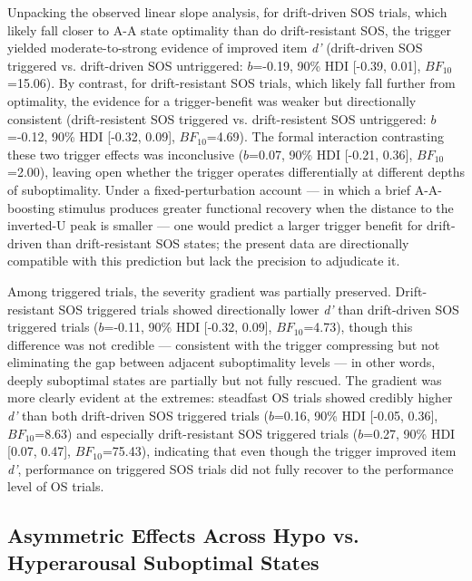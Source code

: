 Unpacking the observed linear slope analysis, for drift-driven SOS trials, which likely fall closer to A-A state optimality than do drift-resistant SOS, the trigger yielded moderate-to-strong evidence of improved item \textit{d'} (drift-driven SOS triggered vs. drift-driven SOS untriggered: $b$=-0.19, 90\% HDI [-0.39, 0.01], $BF_{10}$=15.06). By contrast, for drift-resistant SOS trials, which likely fall further from optimality, the evidence for a trigger-benefit was weaker but directionally consistent (drift-resistent SOS triggered vs. drift-resistent SOS untriggered: $b$=-0.12, 90\% HDI [-0.32, 0.09], $BF_{10}$=4.69). The formal interaction contrasting these two trigger effects was inconclusive ($b$=0.07, 90\% HDI [-0.21, 0.36], $BF_{10}$=2.00), leaving open whether the trigger operates differentially at different depths of suboptimality. Under a fixed-perturbation account — in which a brief A-A-boosting stimulus produces greater functional recovery when the distance to the inverted-U peak is smaller — one would predict a larger trigger benefit for drift-driven than drift-resistant SOS states; the present data are directionally compatible with this prediction but lack the precision to adjudicate it.

Among triggered trials, the severity gradient was partially preserved. Drift-resistant SOS triggered trials showed directionally lower \textit{d'} than drift-driven SOS triggered trials ($b$=-0.11, 90\% HDI [-0.32, 0.09], $BF_{10}$=4.73), though this difference was not credible — consistent with the trigger compressing but not eliminating the gap between adjacent suboptimality levels — in other words, deeply suboptimal states are partially but not fully rescued. The gradient was more clearly evident at the extremes: steadfast OS trials showed credibly higher \textit{d'} than both drift-driven SOS triggered trials ($b$=0.16, 90\% HDI [-0.05, 0.36], $BF_{10}$=8.63) and especially drift-resistant SOS triggered trials ($b$=0.27, 90\% HDI [0.07, 0.47], $BF_{10}$=75.43), indicating that even though the trigger improved item \textit{d'}, performance on triggered SOS trials did not fully recover to the performance level of OS trials.

\subsection{Asymmetric Effects Across Hypo vs. Hyperarousal Suboptimal States}

